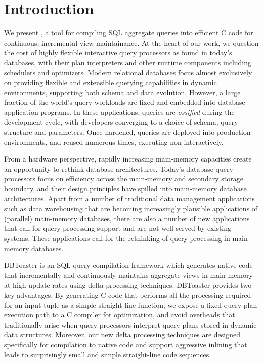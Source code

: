 \section{Introduction}


We present \compiler, a tool for compiling
SQL aggregate queries into efficient C code for
continuous, incremental view maintainance.
%
At the heart of our work, we question the cost of
highly flexible interactive query processors as found in today's databases,
with their plan
interpreters and other runtime components including schedulers and optimizers.
Modern relational databases focus almost exclusively on providing flexible and
extensible querying capabilities in dynamic environments, supporting both
schema and data evolution.
%
However, a large fraction of the world's query workloads
are fixed and embedded into database application programs.
In these applications, queries are \textit{ossified} during the development
cycle, with developers converging to a choice of schema, query structure and parameters.
Once hardened, queries are deployed into production environments, and re\-used
numerous times, executing non-interactively.


From a hardware perspective, rapidly increasing main-memory
capacities create an opportunity to rethink database architectures. Today's
database query processors focus on efficiency across the main-memory and
secondary storage boundary, and their design principles have spilled
into main-memory database architectures. Apart from a number of traditional
data management applications such as data warehousing that are becoming
increasingly
plausible applications of (parallel) main-memory databases, there are also a
number of new applications that call for query processing support and are
not well served by existing systems.
These applications call for the rethinking of query processing in main
memory databases.





DBToaster is an   SQL query  compilation framework  which generates
native  code that incrementally  and continuously  maintains aggregate
views  in main  memory at  high  update rates  using delta  processing
techniques. DBToaster provides two  key advantages.
%
By generating C  code that  performs all the  processing required  for an
input  tuple as  a simple  straight-line function,  we expose  a fixed
query plan execution path to  a C compiler for optimization, and avoid
overheads that traditionally arise when query processors interpret
query plans stored in dynamic data structures.
%
Moreover, our new delta processing techniques
are designed specifically
for compilation to native code and support aggressive inlining
that leads to surprisingly small and simple
straight-line code sequences.

